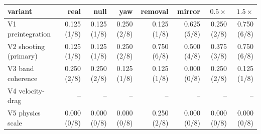 \footnotesize
\begin{tabular}{lrrrrrrr}
\toprule
variant & real & null & yaw & removal & mirror & $0.5\times$ & $1.5\times$ \\
\midrule
V1 preintegration & 0.125 (1/8) & 0.125 (1/8) & 0.250 (2/8) & 0.125 (1/8) & 0.625 (5/8) & 0.250 (2/8) & 0.750 (6/8) \\
V2 shooting (primary) & 0.125 (1/8) & 0.125 (1/8) & 0.250 (2/8) & 0.750 (6/8) & 0.500 (4/8) & 0.375 (3/8) & 0.750 (6/8) \\
V3 band coherence & 0.250 (2/8) & 0.250 (2/8) & 0.125 (1/8) & 0.125 (1/8) & 0.000 (0/8) & 0.250 (2/8) & 0.125 (1/8) \\
V4 velocity-drag & -- & -- & -- & -- & -- & -- & -- \\
V5 physics scale & 0.000 (0/8) & 0.000 (0/8) & 0.000 (0/8) & 0.250 (2/8) & 0.000 (0/8) & 0.000 (0/8) & 0.000 (0/8) \\
\bottomrule
\end{tabular}
